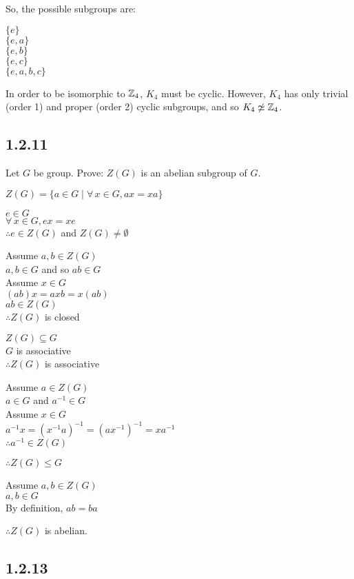 \documentclass[letterpaper,12pt,fleqn]{article}
\newcommand{\iso}{\simeq}
\begin{document}
So, the possible subgroups are:

$\{e\}$ \\
$\{e,a\}$ \\
$\{e,b\}$ \\
$\{e,c\}$ \\
$\{e,a,b,c\}$

In order to be isomorphic to $\mathbb{Z}_4$, $K_4$ must be cyclic. However, $K_4$ has
only trivial (order 1) and proper (order 2) cyclic subgroups, and so
$K_4\not\iso\Z_4$.

\subsection*{1.2.11}

Let $G$ be group. Prove: $Z(G)$ is an abelian subgroup of $G$.

$Z(G)=\{a\in G\mid \forall\,x\in G,ax=xa\}$

$e\in G$ \\
$\forall\,x\in G,ex=xe$ \\
$\therefore e\in Z(G)$ and $Z(G)\ne\emptyset$

Assume $a,b\in Z(G)$ \\
$a,b\in G$ and so $ab\in G$ \\
Assume $x\in G$ \\
$(ab)x=axb=x(ab)$ \\
$ab\in Z(G)$ \\
$\therefore Z(G)$ is closed

$Z(G)\subseteq G$ \\
$G$ is associative \\
$\therefore Z(G)$ is associative

Assume $a\in Z(G)$ \\
$a\in G$ and $a^{-1}\in G$ \\
Assume $x\in G$ \\
$a^{-1}x=(x^{-1}a)^{-1}=(ax^{-1})^{-1}=xa^{-1}$ \\
$\therefore a^{-1}\in Z(G)$

$\therefore Z(G)\le G$

Assume $a,b\in Z(G)$ \\
$a,b\in G$ \\
By definition, $ab=ba$

$\therefore Z(G)$ is abelian.

\subsection*{1.2.13}
\end{document}
